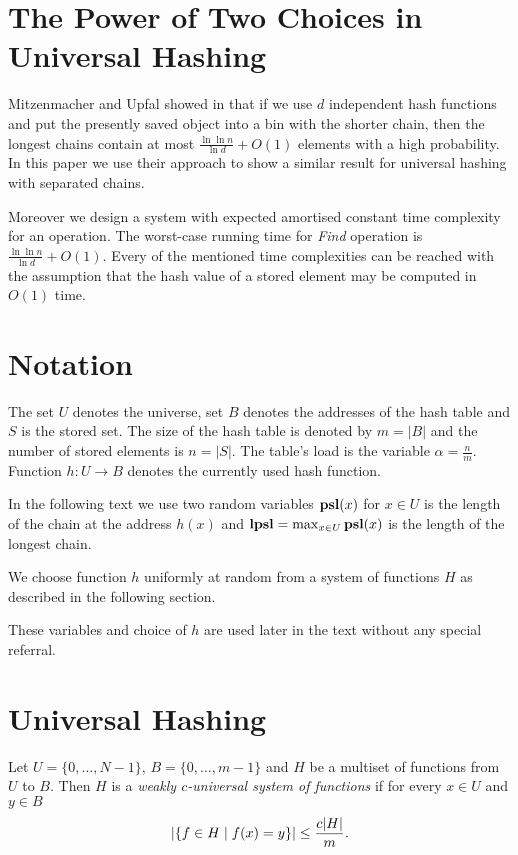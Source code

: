 \section{The Power of Two Choices in Universal Hashing}

Mitzenmacher and Upfal showed in \cite{1076315} that if we use $d$ independent hash functions and put the presently saved object into a bin with the shorter chain, then the longest chains contain at most $\frac{\ln \ln n}{\ln d} + O(1)$ elements with a high probability. In this paper we use their approach to show a similar result for universal hashing with separated chains.

Moreover we design a system with expected amortised constant time complexity for an operation. The worst-case running time for \emph{Find} operation is $\frac{\ln \ln n}{\ln d} + O(1)$. Every of the mentioned time complexities can be reached with the assumption that the hash value of a stored element may be computed in $O(1)$ time.

\section{Notation}
The set $U$ denotes the universe, set $B$ denotes the addresses of the hash table and $S$ is the stored set. The size of the hash table is denoted by $m = |B|$ and the number of stored elements is $n = |S|$. The table's load is the variable $\alpha = \frac{n}{m}$. Function $h: U \rightarrow B$ denotes the currently used hash function.

In the following text we use two random variables $\mathbf{psl}(x)$ for $x \in U$ is the length of the chain at the address $h(x)$ and $\mathbf{lpsl} = \max_{x \in U} \mathbf{psl}(x)$ is the length of the longest chain. 

We choose function $h$ uniformly at random from a system of functions $H$ as described in the following section. 

These variables and choice of $h$ are used later in the text without any special referral.
\section{Universal Hashing}
\begin{definition}
\label{definition-c-universal-system}
Let $U = \lbrace 0, \dots, N - 1 \rbrace$, $B = \lbrace 0, \dots, m - 1 \rbrace$ and $H$ be a multiset of functions from $U$ to $B$. Then $H$ is a \emph{weakly $c$-universal system of functions} if for every $x \in U$ and $y \in B$ 
\[
\left|\lbrace f \in H \mid f(x) = y \rbrace\right| \leq \frac{c |H|}{m} \textit{.}
\]
\end{definition}


